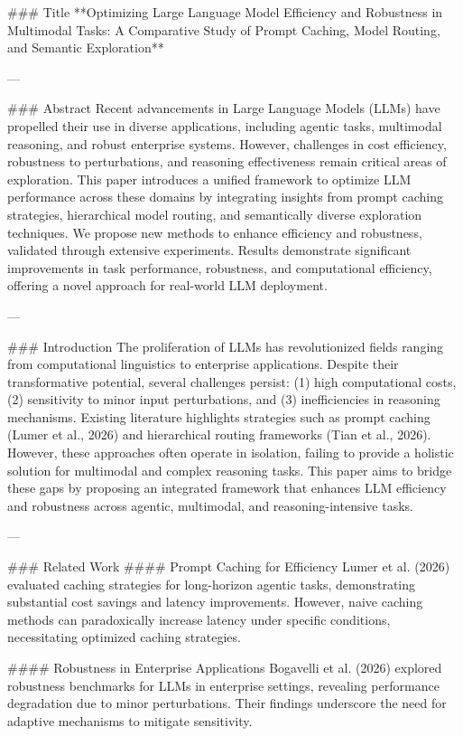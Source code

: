 ### Title  
**Optimizing Large Language Model Efficiency and Robustness in Multimodal Tasks: A Comparative Study of Prompt Caching, Model Routing, and Semantic Exploration**  

---

### Abstract  
Recent advancements in Large Language Models (LLMs) have propelled their use in diverse applications, including agentic tasks, multimodal reasoning, and robust enterprise systems. However, challenges in cost efficiency, robustness to perturbations, and reasoning effectiveness remain critical areas of exploration. This paper introduces a unified framework to optimize LLM performance across these domains by integrating insights from prompt caching strategies, hierarchical model routing, and semantically diverse exploration techniques. We propose new methods to enhance efficiency and robustness, validated through extensive experiments. Results demonstrate significant improvements in task performance, robustness, and computational efficiency, offering a novel approach for real-world LLM deployment.  

---

### Introduction  
The proliferation of LLMs has revolutionized fields ranging from computational linguistics to enterprise applications. Despite their transformative potential, several challenges persist: (1) high computational costs, (2) sensitivity to minor input perturbations, and (3) inefficiencies in reasoning mechanisms. Existing literature highlights strategies such as prompt caching (Lumer et al., 2026) and hierarchical routing frameworks (Tian et al., 2026). However, these approaches often operate in isolation, failing to provide a holistic solution for multimodal and complex reasoning tasks. This paper aims to bridge these gaps by proposing an integrated framework that enhances LLM efficiency and robustness across agentic, multimodal, and reasoning-intensive tasks.  

---

### Related Work  
#### Prompt Caching for Efficiency  
Lumer et al. (2026) evaluated caching strategies for long-horizon agentic tasks, demonstrating substantial cost savings and latency improvements. However, naive caching methods can paradoxically increase latency under specific conditions, necessitating optimized caching strategies.  

#### Robustness in Enterprise Applications  
Bogavelli et al. (2026) explored robustness benchmarks for LLMs in enterprise settings, revealing performance degradation due to minor perturbations. Their findings underscore the need for adaptive mechanisms to mitigate sensitivity.  

